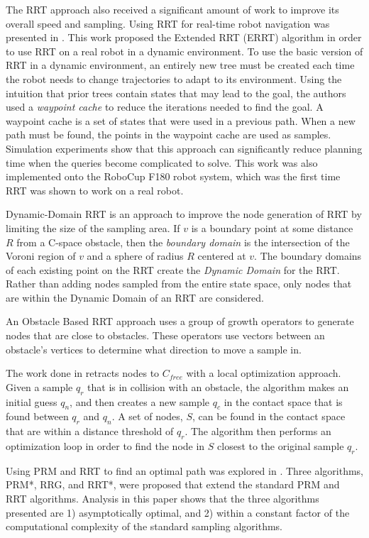 \documentclass[10pt,conference]{ieeeconf}
\begin{document}
The RRT approach also received a significant amount of work to improve its overall speed and sampling. Using RRT for real-time robot navigation was presented in \cite{bruce2002real}. This work proposed the Extended RRT (ERRT) algorithm in order to use RRT on a real robot in a dynamic environment. To use the basic version of RRT in a dynamic environment, an entirely new tree must be created each time the robot needs to change trajectories to adapt to its environment. Using the intuition that prior trees contain states that may lead to the goal, the authors used a \emph{waypoint cache} to reduce the iterations needed to find the goal. A waypoint cache is a set of states that were used in a previous path. When a new path must be found, the points in the waypoint cache are used as samples. Simulation experiments show that this approach can significantly reduce planning time when the queries become complicated to solve. This work was also implemented onto the RoboCup F180 robot system, which was the first time RRT was shown to work on a real robot. 

Dynamic-Domain RRT \cite{yershova2005dynamic} is an approach to improve the node generation of RRT by limiting the size of the sampling area. If $v$ is a boundary point at some distance $R$ from a C-space obstacle, then the \emph{boundary domain} is the intersection of the Voroni region of $v$ and a sphere of radius $R$ centered at $v$. The boundary domains of each existing point on the RRT create the \emph{Dynamic Domain} for the RRT. Rather than adding nodes sampled from the entire state space, only nodes that are within the Dynamic Domain of an RRT are considered.

An Obstacle Based RRT approach \cite{tang2006obstacle} uses a group of growth operators to generate nodes that are close to obstacles. These operators use vectors between an obstacle's vertices to determine what direction to move a sample in. 

The work done in \cite{zhang2008efficient} retracts nodes to $C_{free}$ with a local optimization approach. Given a sample $q_r$ that is in collision with an obstacle, the algorithm makes an initial guess $q_n$, and then creates a new sample $q_c$ in the contact space that is found between $q_r$ and $q_n$. A set of nodes, $S$, can be found in the contact space that are within a distance threshold of $q_r$. The algorithm then performs an optimization loop in order to find the node in $S$ closest to the original sample $q_r$.


Using PRM and RRT to find an optimal path was explored in \cite{karaman2011sampling}. Three algorithms, PRM*, RRG, and RRT*, were proposed that extend the standard PRM and RRT algorithms. Analysis in this paper shows that the three algorithms presented are 1) asymptotically optimal, and 2) within a constant factor of the computational complexity of the standard sampling algorithms. 
\end{document}
